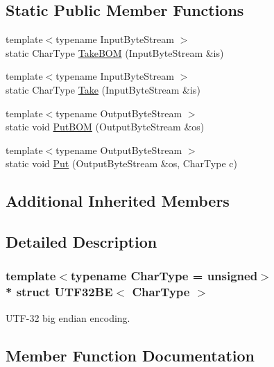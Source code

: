 \subsection*{Static Public Member Functions}
\begin{DoxyCompactItemize}
\item 
{\footnotesize template$<$typename Input\+Byte\+Stream $>$ }\\static Char\+Type \hyperlink{structUTF32BE_a07d228f51ad43ef83af2529ca4bd1181}{Take\+B\+OM} (Input\+Byte\+Stream \&is)
\item 
{\footnotesize template$<$typename Input\+Byte\+Stream $>$ }\\static Char\+Type \hyperlink{structUTF32BE_ace3086ece3b13417c758b5abcf3016c8}{Take} (Input\+Byte\+Stream \&is)
\item 
{\footnotesize template$<$typename Output\+Byte\+Stream $>$ }\\static void \hyperlink{structUTF32BE_a8b1a216dd267ff06a9000cbe593ebd24}{Put\+B\+OM} (Output\+Byte\+Stream \&os)
\item 
{\footnotesize template$<$typename Output\+Byte\+Stream $>$ }\\static void \hyperlink{structUTF32BE_ad270b8b016d477f7f7354df535fa28c5}{Put} (Output\+Byte\+Stream \&os, Char\+Type c)
\end{DoxyCompactItemize}
\subsection*{Additional Inherited Members}


\subsection{Detailed Description}
\subsubsection*{template$<$typename Char\+Type = unsigned$>$\\*
struct U\+T\+F32\+B\+E$<$ Char\+Type $>$}

U\+T\+F-\/32 big endian encoding. 

\subsection{Member Function Documentation}
